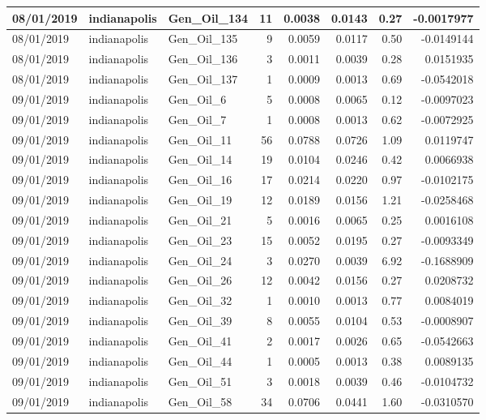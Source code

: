 \documentclass[
  letterpaper,
  DIV=11,
  numbers=noendperiod]{scrartcl}
\begin{document}
\begin{tabular}{l|l|l|r|r|r|r|r}
\hline
08/01/2019 & indianapolis & Gen\_Oil\_134 & 11 & 0.0038 & 0.0143 & 0.27 & -0.0017977\\
\hline
08/01/2019 & indianapolis & Gen\_Oil\_135 & 9 & 0.0059 & 0.0117 & 0.50 & -0.0149144\\
\hline
08/01/2019 & indianapolis & Gen\_Oil\_136 & 3 & 0.0011 & 0.0039 & 0.28 & 0.0151935\\
\hline
08/01/2019 & indianapolis & Gen\_Oil\_137 & 1 & 0.0009 & 0.0013 & 0.69 & -0.0542018\\
\hline
09/01/2019 & indianapolis & Gen\_Oil\_6 & 5 & 0.0008 & 0.0065 & 0.12 & -0.0097023\\
\hline
09/01/2019 & indianapolis & Gen\_Oil\_7 & 1 & 0.0008 & 0.0013 & 0.62 & -0.0072925\\
\hline
09/01/2019 & indianapolis & Gen\_Oil\_11 & 56 & 0.0788 & 0.0726 & 1.09 & 0.0119747\\
\hline
09/01/2019 & indianapolis & Gen\_Oil\_14 & 19 & 0.0104 & 0.0246 & 0.42 & 0.0066938\\
\hline
09/01/2019 & indianapolis & Gen\_Oil\_16 & 17 & 0.0214 & 0.0220 & 0.97 & -0.0102175\\
\hline
09/01/2019 & indianapolis & Gen\_Oil\_19 & 12 & 0.0189 & 0.0156 & 1.21 & -0.0258468\\
\hline
09/01/2019 & indianapolis & Gen\_Oil\_21 & 5 & 0.0016 & 0.0065 & 0.25 & 0.0016108\\
\hline
09/01/2019 & indianapolis & Gen\_Oil\_23 & 15 & 0.0052 & 0.0195 & 0.27 & -0.0093349\\
\hline
09/01/2019 & indianapolis & Gen\_Oil\_24 & 3 & 0.0270 & 0.0039 & 6.92 & -0.1688909\\
\hline
09/01/2019 & indianapolis & Gen\_Oil\_26 & 12 & 0.0042 & 0.0156 & 0.27 & 0.0208732\\
\hline
09/01/2019 & indianapolis & Gen\_Oil\_32 & 1 & 0.0010 & 0.0013 & 0.77 & 0.0084019\\
\hline
09/01/2019 & indianapolis & Gen\_Oil\_39 & 8 & 0.0055 & 0.0104 & 0.53 & -0.0008907\\
\hline
09/01/2019 & indianapolis & Gen\_Oil\_41 & 2 & 0.0017 & 0.0026 & 0.65 & -0.0542663\\
\hline
09/01/2019 & indianapolis & Gen\_Oil\_44 & 1 & 0.0005 & 0.0013 & 0.38 & 0.0089135\\
\hline
09/01/2019 & indianapolis & Gen\_Oil\_51 & 3 & 0.0018 & 0.0039 & 0.46 & -0.0104732\\
\hline
09/01/2019 & indianapolis & Gen\_Oil\_58 & 34 & 0.0706 & 0.0441 & 1.60 & -0.0310570\\

\end{tabular}
\end{document}

